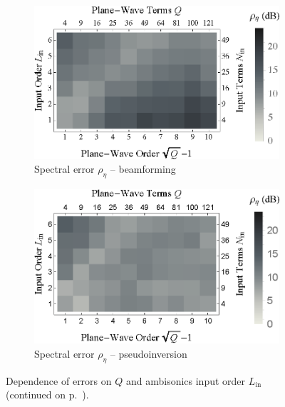 \begin{figure}[t]
	\vspace{0.5cm}
	\begin{subfigure}[b]{0.49\textwidth}
        		\includegraphics[width=\textwidth]{07_characterization_extrapolation/figures/scharer2009_order_pwt-bf.eps}
        		\caption{Spectral error $\rho_\eta$ -- beamforming}
        		\label{fig:07_Characterization_Extrapolation:Spectral_Order:PWT-bf}
    	\end{subfigure}
	\hfill
    	\begin{subfigure}[b]{0.49\textwidth}
        		\includegraphics[width=\textwidth]{07_characterization_extrapolation/figures/scharer2009_order_pwt-pinv.eps}
        		\caption{Spectral error $\rho_\eta$ -- pseudoinversion}
        		\label{fig:07_Characterization_Extrapolation:Spectral_Order:PWT-pinv}
    	\end{subfigure}
	
	\caption[Dependence of errors on plane-wave terms and ambisonics input order.]{
	Dependence of errors on $Q$ and ambisonics input order $L_\text{in}$ (continued on p.~\pageref{fig:07_Characterization_Extrapolation:PWT_Order_Dependence:contd}).}
	\label{fig:07_Characterization_Extrapolation:PWT_Order_Dependence}
\end{figure}

